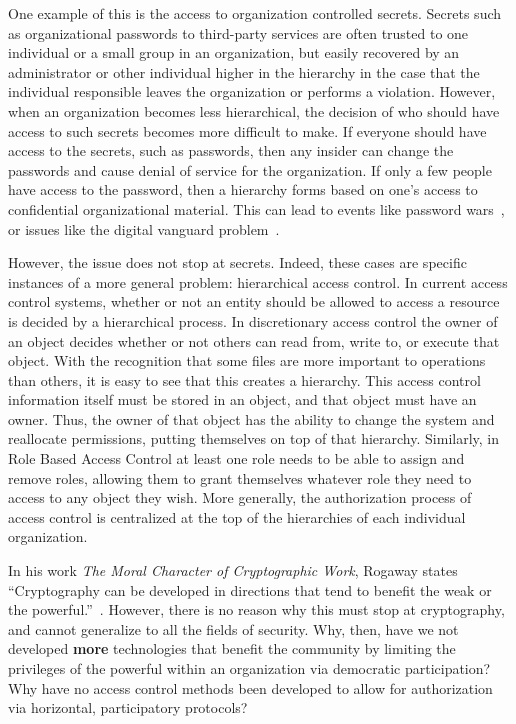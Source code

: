 One example of this is the access to organization controlled secrets. Secrets
such as organizational passwords to third-party services are often trusted to
one individual or a small group in an organization, but easily recovered by an
administrator or other individual higher in the hierarchy in the case that the
individual responsible leaves the organization or performs a violation. However,
when an organization becomes less hierarchical, the decision of who should have
access to such secrets becomes more difficult to make. If everyone should have
access to the secrets, such as passwords, then any insider can change the
passwords and cause denial of service for the organization. If only a few people
have access to the password, then a hierarchy forms based on one's access to
confidential organizational material. This can lead to events like password 
wars~\cite{kavada2020counterpublics}, or issues like the digital vanguard
problem~\cite{gerbaudo2017social}.

However, the issue does not stop at secrets. Indeed, these cases are specific
instances of a more general problem: hierarchical access control. In current
access control systems, whether or not an entity should be allowed to access
a resource is decided by a hierarchical process. In discretionary access control
the owner of an object decides whether or not others can read from, write to, or
execute that object. With the recognition that some files are more important to
operations than others, it is easy to see that this creates a hierarchy. This
access control information itself must be stored in an object, and that object
must have an owner. Thus, the owner of that object has the ability to change the
system and reallocate permissions, putting themselves on top of that hierarchy.
Similarly, in Role Based Access Control at least one role needs to be able to
assign and remove roles, allowing them to grant themselves whatever role they
need to access to any object they wish. More generally, the authorization
process of access control is centralized at the top of the hierarchies of each
individual organization.

In his work \textit{The Moral Character of Cryptographic Work}, Rogaway states
``Cryptography can be developed in directions that tend to benefit the weak or
the powerful.''~\cite{rogaway2015moral}. However, there is no reason why this
must stop at cryptography, and cannot generalize to all the fields of security.
Why, then, have we not developed \textbf{more} technologies that benefit the
community by limiting the privileges of the powerful within an organization via
democratic participation? Why have no access control methods been developed to
allow for authorization via horizontal, participatory protocols?


